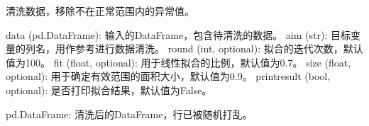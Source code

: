 \documentclass[a4paper,12pt,english]{sphinxmanual}
\begin{document}

\begin{fulllineitems}
\label{\detokenize{api/DataProcess:DataProcess.dataclean}}
\pysigstartsignatures
{}
\pysigstopsignatures
\sphinxAtStartPar
清洗数据，移除不在正常范围内的异常值。
\begin{description}
\sphinxAtStartPar
data (pd.DataFrame): 输入的DataFrame，包含待清洗的数据。
aim (str): 目标变量的列名，用作参考进行数据清洗。
round (int, optional): 拟合的迭代次数，默认值为100。
fit (float, optional): 用于线性拟合的比例，默认值为0.7。
size (float, optional): 用于确定有效范围的面积大小，默认值为0.9。
printresult (bool, optional): 是否打印拟合结果，默认值为False。

\sphinxAtStartPar
pd.DataFrame: 清洗后的DataFrame，行已被随机打乱。


\end{description}
\end{fulllineitems}
\end{document}
